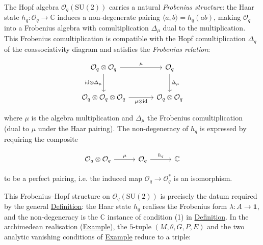 \begin{remark}
  \label{rem:frobenius-simplification}
The Hopf algebra $\mathcal{O}_q(\mathrm{SU}(2))$ carries a natural
\emph{Frobenius structure}: the Haar state
$h_q \colon \mathcal{O}_q \to \mathbb{C}$ induces a non-degenerate
pairing $\langle a, b \rangle = h_q(ab)$, making $\mathcal{O}_q$ into
a Frobenius algebra with comultiplication $\Delta_\mu$ dual to the
multiplication. This Frobenius comultiplication is compatible with the
Hopf comultiplication $\Delta_q$ of the coassociativity diagram and
satisfies the \emph{Frobenius relation}:

\begin{equation}\label{eq:frobenius-relation-elab}
\begin{tikzcd}[row sep=2.5em, column sep=3.5em]
  \mathcal{O}_q \otimes \mathcal{O}_q
    \ar[r, "\mu"]
    \ar[d, "\mathrm{id} \otimes \Delta_\mu"']
  & \mathcal{O}_q
    \ar[d, "\Delta_\mu"]
  \\
  \mathcal{O}_q \otimes \mathcal{O}_q \otimes \mathcal{O}_q
    \ar[r, "\mu \otimes \mathrm{id}"']
  & \mathcal{O}_q \otimes \mathcal{O}_q
\end{tikzcd}
\end{equation}

where $\mu$ is the algebra multiplication and $\Delta_\mu$ the
Frobenius comultiplication (dual to $\mu$ under the Haar pairing).
The non-degeneracy of $h_q$ is expressed by requiring the composite

\begin{equation}\label{eq:frobenius-nondegen}
\begin{tikzcd}[column sep=3em]
  \mathcal{O}_q \otimes \mathcal{O}_q
    \ar[r, "\mu"]
  & \mathcal{O}_q
    \ar[r, "h_q"]
  & \mathbb{C}
\end{tikzcd}
\end{equation}

to be a perfect pairing, i.e. the induced map
$\mathcal{O}_q \to \mathcal{O}_q^*$ is an isomorphism.

This Frobenius--Hopf structure on $\mathcal{O}_q(\mathrm{SU}(2))$ is
precisely the datum required by the general
\hyperref[def:quantum-universe]{Definition}: the Haar state $h_q$ realises
the Frobenius form $\lambda \colon A \to \mathbf{1}$, and the
non-degeneracy is the $\mathbb{C}$
instance of condition (1) in
\hyperref[def:quantum-observable-universe]{Definition}.
In the archimedean realisation (\hyperref[def:c-quantum-universe]{Example}),
the $5$-tuple $(M, \theta, G, P, E)$ and the two analytic vanishing
conditions of \hyperref[def:c-quantum-observable-universe]{Example}
reduce to a triple:


\end{remark}
